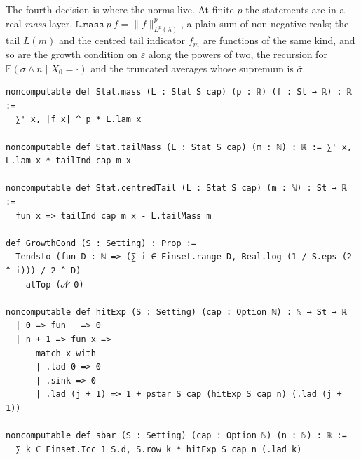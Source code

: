 The fourth decision is where the norms live. At finite $p$ the statements are in a real
\emph{mass} layer, $\texttt{L.mass}\ p\ f=\|f\|^p_{L^p(\lambda)}$, a plain sum of non-negative
reals; the tail $L(m)$ and the centred tail indicator $f_m$ are functions of the same kind, and
so are the growth condition on $\varepsilon$ along the powers of two, the recursion for
$\mathbb E(\sigma\wedge n\mid X_0=\cdot)$ and the truncated averages whose supremum is
$\bar\sigma$.
\begin{lstlisting}[style=lean]
noncomputable def Stat.mass (L : Stat S cap) (p : ℝ) (f : St → ℝ) : ℝ :=
  ∑' x, |f x| ^ p * L.lam x

noncomputable def Stat.tailMass (L : Stat S cap) (m : ℕ) : ℝ := ∑' x, L.lam x * tailInd cap m x

noncomputable def Stat.centredTail (L : Stat S cap) (m : ℕ) : St → ℝ :=
  fun x => tailInd cap m x - L.tailMass m

def GrowthCond (S : Setting) : Prop :=
  Tendsto (fun D : ℕ => (∑ i ∈ Finset.range D, Real.log (1 / S.eps (2 ^ i))) / 2 ^ D)
    atTop (𝓝 0)

noncomputable def hitExp (S : Setting) (cap : Option ℕ) : ℕ → St → ℝ
  | 0 => fun _ => 0
  | n + 1 => fun x =>
      match x with
      | .lad 0 => 0
      | .sink => 0
      | .lad (j + 1) => 1 + pstar S cap (hitExp S cap n) (.lad (j + 1))

noncomputable def sbar (S : Setting) (cap : Option ℕ) (n : ℕ) : ℝ :=
  ∑ k ∈ Finset.Icc 1 S.d, S.row k * hitExp S cap n (.lad k)
\end{lstlisting}

